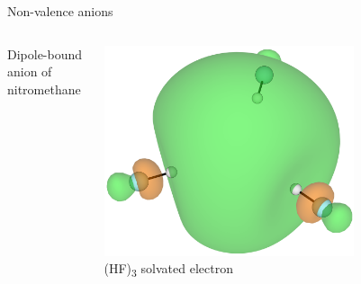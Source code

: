 \documentclass[9pt,t,xcolor=table]{beamer}
\begin{document}
\begin{frame}{\huge Non-valence anions}
\begin{columns}
\begin{column}{0.3\textwidth}
			\vspace{3pt}
    		\small Dipole-bound anion of nitromethane
		\end{column}
		\begin{column}{0.27\textwidth}
			\centering
			\includegraphics[width=0.7\textwidth]{Figs/hf3.png}\\
			\vspace{3pt}
			\small (HF)\textsubscript{3} solvated electron
		\end{column}	
	\end{columns}
\end{frame}
\end{document}
